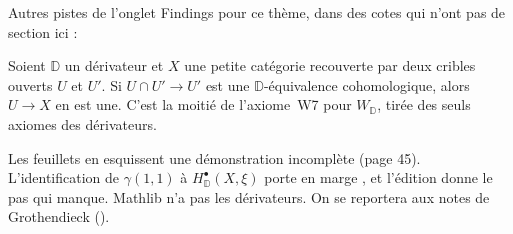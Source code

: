 \bigskip
\noindent Autres pistes de l'onglet Findings pour ce thème, dans des cotes qui n'ont pas de section ici :\par

\begin{encadre}
\begin{theoreme*}\nonverifie
Soient $\mathbb D$ un dérivateur et $X$ une petite catégorie recouverte par deux cribles ouverts $U$ et $U'$. Si $U \cap U' \to U'$ est une $\mathbb D$-équivalence cohomologique, alors $U \to X$ en est une. C'est la moitié de l'axiome~W7 pour $W_{\mathbb D}$, tirée des seuls axiomes des dérivateurs.
\end{theoreme*}
\end{encadre}
{\small Les feuillets en esquissent une démonstration incomplète (page 45). L'identification de $\gamma(1,1)$ à $H^\bullet_{\mathbb D}(X, \xi)$ porte en marge , et l'édition donne le pas qui manque. Mathlib n'a pas les dérivateurs. On se reportera aux notes de Grothendieck ().\par}

